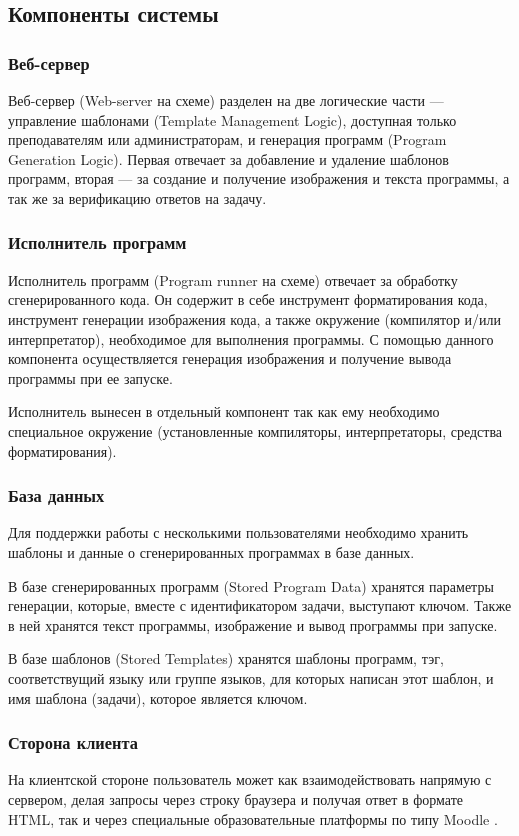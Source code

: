 \subsection{Компоненты системы}

\subsubsection{Веб-сервер}
Веб-сервер (Web-server на схеме) разделен на две логические части ---
управление шаблонами (Template Management Logic), доступная только преподавателям
или администраторам, и генерация программ (Program Generation Logic). Первая отвечает
за добавление и удаление шаблонов программ, вторая --- за создание и получение изображения
и текста программы, а так же за верификацию ответов на задачу.

\subsubsection{Исполнитель программ}
Исполнитель программ (Program runner на схеме) отвечает за обработку сгенерированного
кода. Он содержит в себе инструмент форматирования кода, инструмент генерации изображения
кода, а также окружение (компилятор и/или интерпретатор), необходимое для выполнения
программы. С помощью данного компонента осуществляется генерация изображения и получение
вывода программы при ее запуске.

Исполнитель вынесен в отдельный компонент так как ему необходимо специальное окружение
(установленные компиляторы, интерпретаторы, средства форматирования).

\subsubsection{База данных}
\label{db-model}
Для поддержки работы с несколькими пользователями необходимо хранить шаблоны и данные о
сгенерированных программах в базе данных.

В базе сгенерированных программ (Stored Program Data) хранятся параметры генерации,
которые, вместе с
идентификатором задачи, выступают ключом. Также в ней хранятся текст программы,
изображение и вывод программы при запуске.

\label{template-db} В базе шаблонов (Stored Templates) хранятся шаблоны программ, тэг, соответствущий языку или группе
языков, для которых написан этот шаблон, и имя шаблона (задачи), которое является ключом.

\subsubsection{Сторона клиента}
На клиентской стороне пользователь может как взаимодействовать напрямую с сервером,
делая запросы через строку браузера и получая ответ в формате HTML, так и через
специальные образовательные платформы по типу Moodle \cite*{moodle}.

